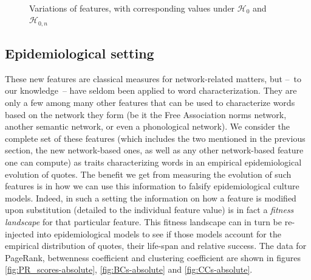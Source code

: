 \begin{figure}[!th]
	\centering
	~
	\caption{Variations of features, with corresponding values under $\mathcal{H}_0$ and $\mathcal{H}_{0,n}$}
\end{figure}


\subsection{Epidemiological setting}

 


These new features are classical measures for network-related matters, but --~to our knowledge~-- have seldom been applied to word characterization. They are only a few among many other features that can be used to characterize words based on the network they form (be it the Free Association norms network, another semantic network, or even a phonological network). We consider the complete set of these features (which includes the two mentioned in the previous section, the new network-based ones, as well as any other network-based feature one can compute) as traits characterizing words in an empirical epidemiological evolution of quotes. The benefit we get from measuring the evolution of such features is in how we can use this information to falsify epidemiological culture models. Indeed, in such a setting the information on how a feature is modified upon substitution (detailed to the individual feature value) is in fact a \emph{fitness landscape} for that particular feature. This fitness landscape can in turn be re-injected into epidemiological models to see if those models account for the empirical distribution of quotes, their life-span and relative success. The data for PageRank, betwenness coefficient and clustering coefficient are shown in figures \ref{fig:PR_scores-absolute}, \ref{fig:BCs-absolute} and \ref{fig:CCs-absolute}.

